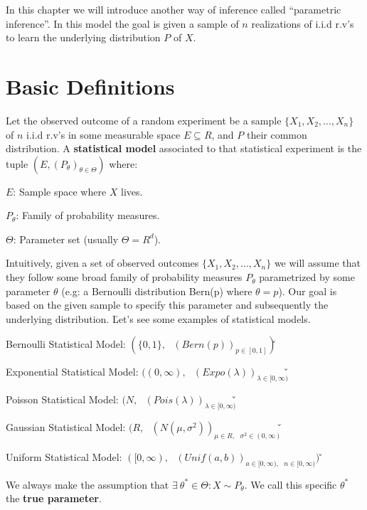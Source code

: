 In this chapter we will introduce another way of inference called ``parametric inference''. In this model the goal
is given a sample of $n$ realizations of i.i.d r.v's to learn the underlying distribution $P$ of $X$.

\section{Basic Definitions}


Let the observed outcome of a random experiment be a sample $\{ X_{1}, X_{2}, \ldots, X_{n} \}$ of $n$ i.i.d r.v's in
some measurable space $E \subseteq R$, and $P$ their common distribution. A \textbf{statistical model} associated to
that statistical experiment is the tuple $(E, (P_{\theta})_{\theta \in \Theta})$ where:
\bit
\item $E$: Sample space where $X$ lives.
\item $P_{\theta}$: Family of probability measures.
\item $\Theta$: Parameter set (usually $\Theta = R^d$).
\eit
\ed

Intuitively, given a set of observed outcomes $\{ X_{1}, X_{2}, \ldots, X_{n} \}$ we will assume that they follow
some broad family of probability measures $P_{\theta}$ parametrized by some parameter $\theta$ (e.g: a Bernoulli
distribution Bern(p) where $\theta = p$). Our goal is based on the given sample to specify this parameter and
subsequently the underlying distribution. \v

Let's see some examples of statistical models.
\bit
\item Bernoulli Statistical Model: $( \{ 0,1 \}, \:\:\: (Bern(p))_{ {p} \in [0,1]})$\v
\item Exponential Statistical Model: $( (0,\infty), \:\:\: (Expo(\lambda))_{\lambda \in [0,\infty)}$\v
\item Poisson Statistical Model: $( N, \:\:\: (Pois(\lambda))_{ \lambda \in [0,\infty)}$\v
\item Gaussian Statistical Model: $( R, \:\:\: (N(\mu, \sigma^2))_{\mu \in R, \:\:\: \sigma^2 \in (0,\infty) }$\v
\item Uniform Statistical Model: $( [0, \infty), \:\:\: (Unif(a,b))_{a \in [0,\infty), \:\:\: n \in [0,\infty)})$ \v
\eit

We always make the assumption that $\exists \: \theta^{*} \in \Theta : X \sim P_{\theta}$. We call this specific
$\theta^{*}$ the \textbf{true parameter}.
\ed

